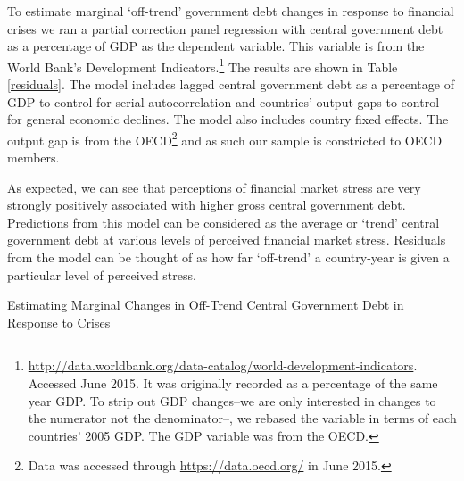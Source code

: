 \documentclass[]{article}
\begin{document}
To estimate marginal `off-trend' government debt changes in response to financial crises we ran a partial correction panel regression with central government debt as a percentage of GDP as the dependent variable. This variable is from the World Bank's Development Indicators.\footnote{\url{http://data.worldbank.org/data-catalog/world-development-indicators}. Accessed June 2015. It was originally recorded as a percentage of the same year GDP. To strip out GDP changes--we are only interested in changes to the numerator not the denominator--, we rebased the variable in terms of each countries' 2005 GDP. The GDP variable was from the OECD.} The results are shown in Table \ref{residuals}. The model includes lagged central government debt as a percentage of GDP to control for serial autocorrelation and countries' output gaps to control for general economic declines. The model also includes country fixed effects. The output gap is from the OECD\footnote{Data was accessed through \url{https://data.oecd.org/} in June 2015.} and as such our sample is constricted to OECD members.

As expected, we can see that perceptions of financial market stress are very strongly positively associated with higher gross central government debt. Predictions from this model can be considered as the average or `trend' central government debt at various levels of perceived financial market stress. Residuals from the model can be thought of as how far `off-trend' a country-year is given a particular level of perceived stress.

\begin{table}
    \caption{Estimating Marginal Changes in Off-Trend Central Government Debt in Response to Crises}
    \label{results_elect}
    \begin{center}
        
    \end{center}
\end{table}
\end{document}
